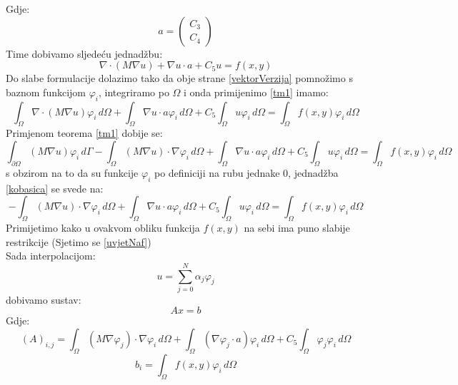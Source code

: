 \documentclass[zavrsnirad]{../fer}
\begin{document}
Gdje:
$$a = 
\begin{pmatrix}
  C_3\\ 
  C_4
\end{pmatrix}
$$
Time dobivamo sljedeću jednadžbu:
\begin{equation}
  \label{vektorVerzija}
\nabla \cdot (M \nabla u)  + \nabla u \cdot a + C_5u = f(x,y)
\end{equation}
Do slabe formulacije dolazimo tako da obje strane \ref{vektorVerzija} 
pomnožimo
s baznom funkcijom $\varphi_i$, integriramo po $\Omega$
i onda primijenimo  \ref{tm1} 
imamo:
\begin{equation}
  \int_{\Omega}\nabla \cdot (M \nabla u) \varphi_i \, d\Omega  + 
  \int_{\Omega} \nabla u \cdot a\varphi_i \, d\Omega  + C_5\int_{\Omega}u\varphi_i\,d\Omega  =
  \int_{\Omega}f(x,y)\varphi_i \, d\Omega 
\end{equation}
Primjenom teorema \ref{tm1} 
dobije se:
\begin{equation}
  \label{kobasica}
  \int_{\partial \Omega}(M \nabla u) \varphi_i \, d\Gamma  - 
  \int_{\Omega}(M \nabla u) \cdot \nabla \varphi_i \, d\Omega  + 
  \int_{\Omega} \nabla u \cdot a\varphi_i \, d\Omega  + C_5\int_{\Omega}u\varphi_i\,d\Omega  =
  \int_{\Omega}f(x,y)\varphi_i \, d\Omega 
\end{equation}
s obzirom na to da su funkcije $\varphi_i$ po definiciji
na rubu jednake $0$, jednadžba 
\ref{kobasica} se 
svede na:
\begin{equation}
  \label{slabaFor}
  -\int_{\Omega}(M \nabla u) \cdot \nabla \varphi_i \, d\Omega  + 
  \int_{\Omega} \nabla u \cdot a\varphi_i \, d\Omega  + C_5\int_{\Omega}u\varphi_i\,d\Omega  =
  \int_{\Omega}f(x,y)\varphi_i \, d\Omega 
\end{equation}
Primijetimo kako u ovakvom obliku funkcija $f(x,y)$ 
na sebi ima puno slabije restrikcije (Sjetimo se \ref{uvjetNaf})
\bigskip
\\
Sada interpolacijom:
$$u = \sum_{j=0}^N \alpha_j \varphi_j$$
dobivamo sustav:
\begin{equation}
\label{linSustav}
A x = b
\end{equation}
Gdje:
\begin{equation}
\label{elMat}
(A)_{i,j} = \int_{\Omega} (M\nabla \varphi_j) \cdot \nabla \varphi_i \, d\Omega + 
\int_{\Omega} (\nabla \varphi_j \cdot a) \varphi_i \, d\Omega +
C_5 \int_{\Omega} \varphi_j \varphi_i \, d\Omega
\end{equation}
$$b_i = \int_{\Omega} f(x,y) \varphi_i \, d \Omega$$
\end{document}
